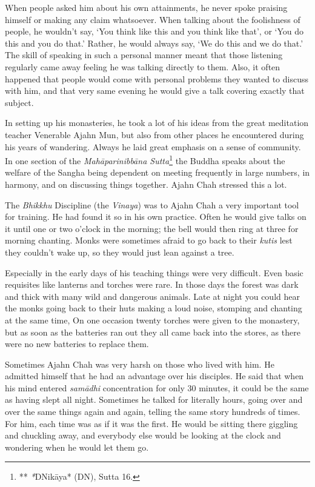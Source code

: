 When people asked him about his own attainments, he never spoke praising
himself or making any claim whatsoever. When talking about the
foolishness of people, he wouldn't say, `You think like this and you
think like that', or `You do this and you do that.' Rather, he would
always say, `We do this and we do that.' The skill of speaking in such a
personal manner meant that those listening regularly came away feeling
he was talking directly to them. Also, it often happened that people
would come with personal problems they wanted to discuss with him, and
that very same evening he would give a talk covering exactly that
subject. 

In setting up his monasteries, he took a lot of his ideas from the great
meditation teacher Venerable Ajahn Mun, but also from other places he
encountered during his years of wandering. Always he laid great emphasis
on a sense of community. In one section of the \emph{Mahāparinibbāna
Sutta}\footnote{** \emph{*}DNikāya* (DN), Sutta 16.} the Buddha speaks
about the welfare of the Sangha being dependent on meeting frequently in
large numbers, in harmony, and on discussing things together. Ajahn Chah
stressed this a lot. 

The \emph{Bhikkhu} Discipline (the \emph{Vinaya}) was to Ajahn Chah a
very important tool for training. He had found it so in his own
practice. Often he would give talks on it until one or two o'clock in
the morning; the bell would then ring at three for morning chanting. 
Monks were sometimes afraid to go back to their \emph{kutis} lest they
couldn't wake up, so they would just lean against a tree. 

Especially in the early days of his teaching things were very difficult. 
Even basic requisites like lanterns and torches were rare. In those days
the forest was dark and thick with many wild and dangerous animals. Late
at night you could hear the monks going back to their huts making a loud
noise, stomping and chanting at the same time, On one occasion twenty
torches were given to the monastery, but as soon as the batteries ran
out they all came back into the stores, as there were no new batteries
to replace them. 

Sometimes Ajahn Chah was very harsh on those who lived with him. He
admitted himself that he had an advantage over his disciples. He said
that when his mind entered \emph{samādhi} concentration for only 30
minutes, it could be the same as having slept all night. Sometimes he
talked for literally hours, going over and over the same things again
and again, telling the same story hundreds of times. For him, each time
was as if it was the first. He would be sitting there giggling and
chuckling away, and everybody else would be looking at the clock and
wondering when he would let them go. 

